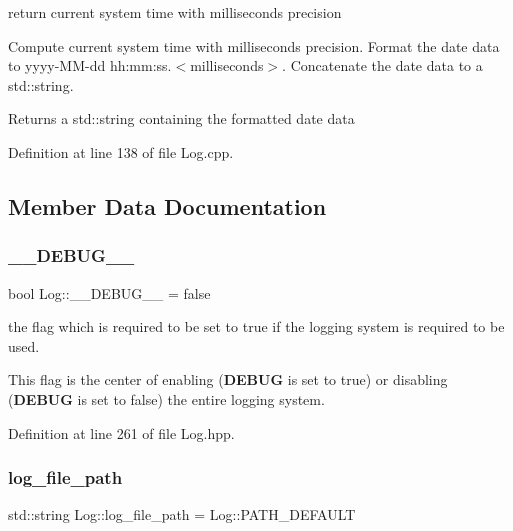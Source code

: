 return current system time with milliseconds precision 

Compute current system time with milliseconds precision. Format the date data to yyyy-\/\+M\+M-\/dd hh\+:mm\+:ss.$<$milliseconds$>$. Concatenate the date data to a std\+::string.

\begin{DoxyReturn}{Returns}
a std\+::string containing the formatted date data 
\end{DoxyReturn}


Definition at line 138 of file Log.\+cpp.



\subsection{Member Data Documentation}
\mbox{\label{class_log_a28d7b6a93a3775f300fe1cfdc228fef9}} 
\subsubsection{\texorpdfstring{\_\_DEBUG\_\_}{\_\_DEBUG\_\_}}
{\footnotesize\ttfamily bool Log\+::\+\_\+\+\_\+\+D\+E\+B\+U\+G\+\_\+\+\_\+ = false\hspace{0.3cm}{\ttfamily [static]}}



the flag which is required to be set to true if the logging system is required to be used. 

This flag is the center of enabling ({\bfseries{D\+E\+B\+UG}} is set to true) or disabling ({\bfseries{D\+E\+B\+UG}} is set to false) the entire logging system. 

Definition at line 261 of file Log.\+hpp.

\mbox{\label{class_log_a3f04a3b97491099c700f3807b013216f}} 
\subsubsection{\texorpdfstring{log\_file\_path}{log\_file\_path}}
{\footnotesize\ttfamily std\+::string Log\+::log\+\_\+file\+\_\+path = Log\+::\+P\+A\+T\+H\+\_\+\+D\+E\+F\+A\+U\+LT\hspace{0.3cm}{\ttfamily [static]}}

